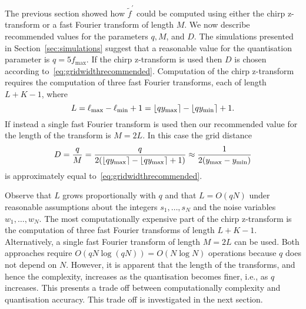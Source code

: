 \documentclass[10pt,twocolumn,twoside]{IEEEtran}
\begin{document}
The previous section showed how $\widetilde{f}^\prime$ could be computed using either the chirp z-transform or a fast Fourier transform of length $M$.  We now describe recommended values for the parameters $q, M$, and $D$.  The simulations presented in Section~\ref{sec:simulations} suggest that a reasonable value for the quantisation parameter is $q = 5 f_{\text{max}}$.  If the chirp z-transform is used then $D$ is chosen according to~\eqref{eq:gridwidthrecommended}.  Computation of the chirp z-transform requires the computation of three fast Fourier transforms, each of length $L + K - 1$, where 
\[
L = \ell_{\text{max}} - \ell_{\text{min}} + 1 = {\left\lfloor qy_{\text{max}} \right\rceil} - {\left\lfloor qy_{\text{min}} \right\rceil} + 1.
\]
If instead a single fast Fourier transform is used then our recommended value for the length of the transform is $M= 2L$.  In this case the grid distance
\[ 
D = \frac{q}{M} = \frac{q}{2({\left\lfloor qy_{\text{max}} \right\rceil} - {\left\lfloor qy_{\text{max}} \right\rceil} + 1)} \approx  \frac{1}{2(y_{\text{max}} - y_{\text{min}})}
\]
is approximately equal to~\eqref{eq:gridwidthrecommended}.  

Observe that $L$ grows proportionally with $q$ and that $L = O(qN)$ under reasonable assumptions about the integers $s_1,\dots,s_N$ and the noise variables $w_1,\dots,w_N$.  The most computationally expensive part of the chirp z-transform is the computation of three fast Fourier transforms of length $L+K-1$.  Alternatively, a single fast Fourier transform of length $M = 2L$ can be used.  Both approaches require $O(qN\log(qN)) = O(N\log N)$ operations because $q$ does not depend on $N$.  However, it is apparent that the length of the transforms, and hence the complexity, increases as the quantisation becomes finer, i.e., as $q$ increases.  This presents a trade off between computationally complexity and quantisation accuracy.  This trade off is investigated in the next section.
\end{document}
